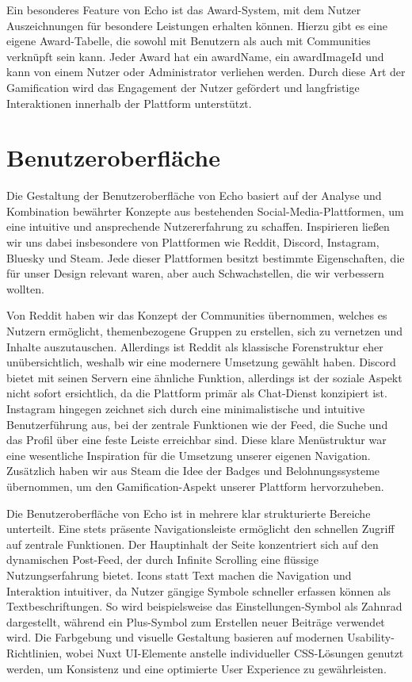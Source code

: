 \documentclass[a4paper,12pt]{article}
\begin{document}
Ein besonderes Feature von Echo ist das Award-System, mit dem Nutzer
Auszeichnungen für besondere Leistungen erhalten können. Hierzu gibt es eine
eigene Award-Tabelle, die sowohl mit Benutzern als auch mit Communities
verknüpft sein kann. Jeder Award hat ein awardName, ein awardImageId und kann
von einem Nutzer oder Administrator verliehen werden. Durch diese Art der
Gamification wird das Engagement der Nutzer gefördert und langfristige
Interaktionen innerhalb der Plattform unterstützt.

\newpage
\section{Benutzeroberfläche}
Die Gestaltung der Benutzeroberfläche von Echo basiert auf der Analyse und
Kombination bewährter Konzepte aus bestehenden Social-Media-Plattformen, um
eine intuitive und ansprechende Nutzererfahrung zu schaffen. Inspirieren ließen
wir uns dabei insbesondere von Plattformen wie Reddit, Discord, Instagram,
Bluesky und Steam. Jede dieser Plattformen besitzt bestimmte Eigenschaften, die
für unser Design relevant waren, aber auch Schwachstellen, die wir verbessern
wollten.

Von Reddit haben wir das Konzept der Communities übernommen, welches es Nutzern
ermöglicht, themenbezogene Gruppen zu erstellen, sich zu vernetzen und Inhalte
auszutauschen. Allerdings ist Reddit als klassische Forenstruktur eher
unübersichtlich, weshalb wir eine modernere Umsetzung gewählt haben. Discord
bietet mit seinen Servern eine ähnliche Funktion, allerdings ist der soziale
Aspekt nicht sofort ersichtlich, da die Plattform primär als Chat-Dienst
konzipiert ist. Instagram hingegen zeichnet sich durch eine minimalistische und
intuitive Benutzerführung aus, bei der zentrale Funktionen wie der Feed, die
Suche und das Profil über eine feste Leiste erreichbar sind. Diese klare
Menüstruktur war eine wesentliche Inspiration für die Umsetzung unserer eigenen
Navigation. Zusätzlich haben wir aus Steam die Idee der Badges und
Belohnungssysteme übernommen, um den Gamification-Aspekt unserer Plattform
hervorzuheben.

Die Benutzeroberfläche von Echo ist in mehrere klar strukturierte Bereiche
unterteilt. Eine stets präsente Navigationsleiste ermöglicht den schnellen
Zugriff auf zentrale Funktionen. Der Hauptinhalt der Seite konzentriert sich
auf den dynamischen Post-Feed, der durch Infinite Scrolling eine flüssige
Nutzungserfahrung bietet. Icons statt Text machen die Navigation und
Interaktion intuitiver, da Nutzer gängige Symbole schneller erfassen können als
Textbeschriftungen. So wird beispielsweise das Einstellungen-Symbol als Zahnrad
dargestellt, während ein Plus-Symbol zum Erstellen neuer Beiträge verwendet
wird. Die Farbgebung und visuelle Gestaltung basieren auf modernen
Usability-Richtlinien, wobei Nuxt UI-Elemente anstelle individueller
CSS-Lösungen genutzt werden, um Konsistenz und eine optimierte User Experience
zu gewährleisten.
\end{document}
